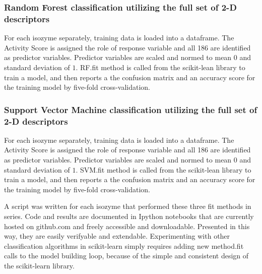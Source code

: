 \subsubsection{Random Forest classification utilizing the full set of 2-D descriptors}
For each isozyme separately, training data is loaded into a dataframe. The Activity Score is assigned the role of response variable and all 186 are identified as predictor variables. Predictor variables are scaled and normed to mean $0$ and standard deviation of $1$. RF.fit method is called from the scikit-lean library to train a model, and then reports a the confusion matrix and an accuracy score for the training model by five-fold cross-validation.

\subsubsection{Support Vector Machine classification utilizing the full set of 2-D descriptors}
For each isozyme separately, training data is loaded into a dataframe. The Activity Score is assigned the role of response variable and all 186 are identified as predictor variables. Predictor variables are scaled and normed to mean $0$ and standard deviation of $1$. SVM.fit method is called from the scikit-lean library to train a model, and then reports a the confusion matrix and an accuracy score for the training model by five-fold cross-validation.

A script was written for each isozyme that performed these three fit methods in series. Code and results are documented in Ipython notebooks that are currently hosted on github.com and freely accessible and downloadable. Presented in this way, they are easily verifyable and extendable. Experimenting with other classification algorithms in scikit-learn simply requires adding new method.fit calls to the model building loop, because of the simple and consistent design of the scikit-learn library.

